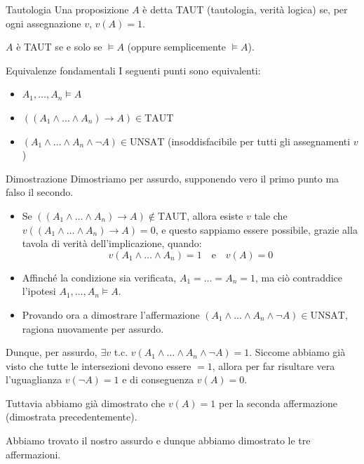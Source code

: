 \documentclass[12pt]{report}
\begin{document}
	\begin{definizione}{Tautologia}{}
		Una proposizione $A$ è detta TAUT (tautologia, verità logica) se, per ogni assegnazione $v$, $v(A) = 1$.
	\end{definizione}
	
	\begin{osservazione}{}{}
		$A$ è TAUT se e solo se $\models A$ (oppure semplicemente $\models A$).
	\end{osservazione}
	
	\begin{teorema}{Equivalenze fondamentali}{}
		I seguenti punti sono equivalenti:
		\begin{itemize}
			\item $A_1, \dots, A_n \models A$
			\item $((A_1 \land \dots \land A_n) \to A) \in \text{TAUT}$
			\item $(A_1 \land \dots \land A_n \land \neg A) \in \text{UNSAT}$ (insoddisfacibile per tutti gli assegnamenti $v$)
		\end{itemize}
	\end{teorema}
	
	\begin{dimostrazione}{Dimostrazione}{}
		Dimostriamo per assurdo, supponendo vero il primo punto ma falso il secondo.
		\begin{itemize}
			\item Se $((A_1 \land \dots \land A_n) \to A) \notin \text{TAUT}$, allora esiste $v$ tale che $v((A_1 \land \dots \land A_n) \to A) = 0$, e questo sappiamo essere possibile, grazie alla tavola di verità dell'implicazione, quando:
			\[
			v(A_1 \land \dots \land A_n) = 1 \quad \text{e} \quad v(A) = 0
			\]
			\item Affinché la condizione sia verificata, $A_1 = \dots = A_n = 1$, ma ciò contraddice l'ipotesi $A_1, \dots, A_n \models A$.
			\item Provando ora a dimostrare l'affermazione $(A_1 \land \dots \land A_n \land \neg A) \in \text{UNSAT}$, ragiona nuovamente per assurdo.
		\end{itemize}
		Dunque, per assurdo, $\exists v$ t.c. $v(A_1 \land \dots \land A_n \land \neg A) = 1$. Siccome abbiamo già visto che tutte le intersezioni devono essere $= 1$, allora per far risultare vera l'uguaglianza $v(\neg A) = 1$ e di conseguenza $v(A) = 0$.
		
		Tuttavia abbiamo già dimostrato che $v(A) = 1$ per la seconda affermazione (dimostrata precedentemente).
		
		Abbiamo trovato il nostro assurdo e dunque abbiamo dimostrato le tre affermazioni.
	\end{dimostrazione}
	
\end{document}
